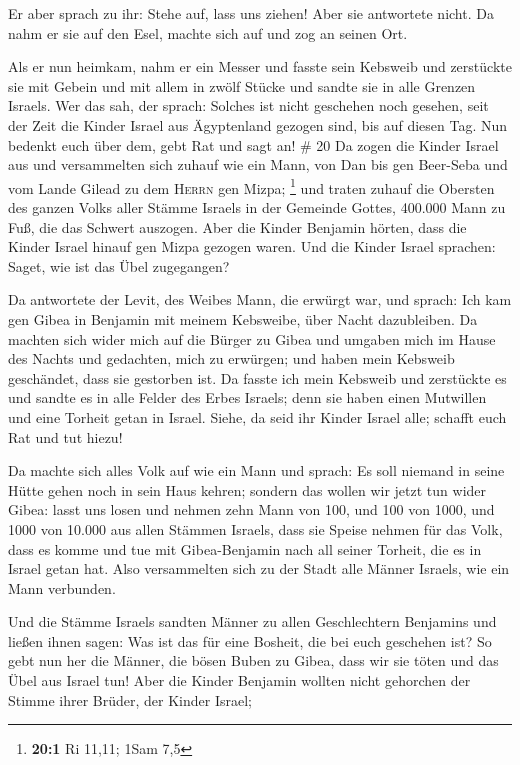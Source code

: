  Er aber sprach zu ihr: Stehe auf, lass uns ziehen! Aber
sie antwortete nicht. Da nahm er sie auf den Esel, machte sich auf und
zog an seinen Ort.

 Als er nun heimkam, nahm er ein Messer und fasste sein
Kebsweib und zerstückte sie mit Gebein und mit allem in zwölf Stücke und
sandte sie in alle Grenzen Israels.  Wer das sah, der
sprach: Solches ist nicht geschehen noch gesehen, seit der Zeit die
Kinder Israel aus Ägyptenland gezogen sind, bis auf diesen Tag. Nun
bedenkt euch über dem, gebt Rat und sagt an! \# 20  Da
zogen die Kinder Israel aus und versammelten sich zuhauf wie ein Mann,
von Dan bis gen Beer-Seba und vom Lande Gilead zu dem \textsc{Herrn} gen
Mizpa; \footnote{\textbf{20:1} Ri 11,11; 1Sam 7,5}  und
traten zuhauf die Obersten des ganzen Volks aller Stämme Israels in der
Gemeinde Gottes, 400.000 Mann zu Fuß, die das Schwert auszogen.
 Aber die Kinder Benjamin hörten, dass die Kinder Israel
hinauf gen Mizpa gezogen waren. Und die Kinder Israel sprachen: Saget,
wie ist das Übel zugegangen?

 Da antwortete der Levit, des Weibes Mann, die erwürgt
war, und sprach: Ich kam gen Gibea in Benjamin mit meinem Kebsweibe,
über Nacht dazubleiben.  Da machten sich wider mich auf
die Bürger zu Gibea und umgaben mich im Hause des Nachts und gedachten,
mich zu erwürgen; und haben mein Kebsweib geschändet, dass sie gestorben
ist.  Da fasste ich mein Kebsweib und zerstückte es und
sandte es in alle Felder des Erbes Israels; denn sie haben einen
Mutwillen und eine Torheit getan in Israel.  Siehe, da
seid ihr Kinder Israel alle; schafft euch Rat und tut hiezu!

 Da machte sich alles Volk auf wie ein Mann und sprach: Es
soll niemand in seine Hütte gehen noch in sein Haus kehren;
 sondern das wollen wir jetzt tun wider Gibea:
 lasst uns losen und nehmen zehn Mann von 100, und 100
von 1000, und 1000 von 10.000 aus allen Stämmen Israels, dass sie Speise
nehmen für das Volk, dass es komme und tue mit Gibea-Benjamin nach all
seiner Torheit, die es in Israel getan hat.  Also
versammelten sich zu der Stadt alle Männer Israels, wie ein Mann
verbunden.

 Und die Stämme Israels sandten Männer zu allen
Geschlechtern Benjamins und ließen ihnen sagen: Was ist das für eine
Bosheit, die bei euch geschehen ist?  So gebt nun her die
Männer, die bösen Buben zu Gibea, dass wir sie töten und das Übel aus
Israel tun! Aber die Kinder Benjamin wollten nicht gehorchen der Stimme
ihrer Brüder, der Kinder Israel;

